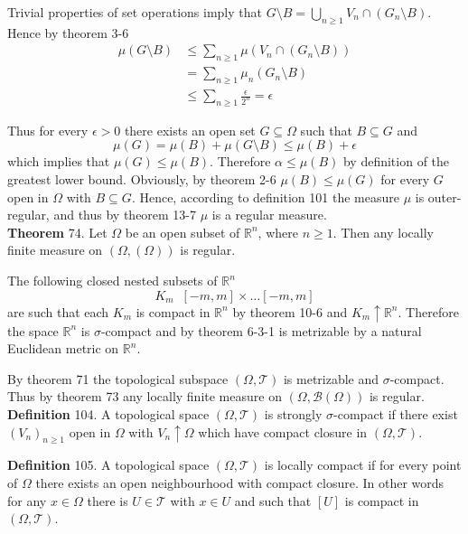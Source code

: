 \documentclass[a4paper]{article}
\newcommand{\clo}[1]{\left [ #1 \right ]}
\newcommand{\brac}[1]{\left ( #1 \right )}
\newcommand{\Real}{\mathbb{R}}
\newcommand{\Tcal}{\mathcal{T}}
\newcommand{\borel}[1]{\mathcal{B}\brac{#1}}
\newcommand{\defn}{\mathop{\overset{\Delta}{=}}\nolimits}
\begin{document}
Trivial properties of set operations imply that $G\setminus B=\bigcup_{n\geq 1} V_n \cap \brac{G_n\setminus B}$. Hence by theorem 3-6\begin{align*}\mu\brac{G\setminus B}&\leq \sum_{n\geq1}\mu\brac{V_n \cap \brac{G_n\setminus B}} \\&= \sum_{n\geq1}\mu_n\brac{G_n\setminus B}\\&\leq \sum_{n\geq1} \frac{\epsilon}{2^n} = \epsilon\end{align*}

Thus for every $\epsilon>0$ there exists an open set $G\subseteq \Omega$ such that $B\subseteq G$ and \[\mu\brac{G}=\mu\brac{B}+\mu\brac{G\setminus B}\leq \mu\brac{B}+\epsilon\] which implies that $\mu\brac{G}\leq \mu\brac{B}$. Therefore $\alpha \leq \mu\brac{B}$ by definition of the greatest lower bound. Obviously, by theorem 2-6 $\mu\brac{B}\leq \mu\brac{G}$ for every $G$ open in $\Omega$ with $B\subseteq G$. Hence, according to definition 101 the measure $\mu$ is outer-regular, and thus by theorem 13-7 $\mu$ is a regular measure.\\

\label{thm:rn_loc_fin_regular_meas} \noindent \textbf{Theorem} 74.
Let $\Omega$ be an open subset of $\Real^n$, where $n\geq1$. Then any locally finite measure on $\brac{\Omega,\brac{\Omega}}$ is regular.

The following closed nested subsets of $\Real^n$ \[K_m\defn \clo{-m,m}\times \ldots \clo{-m,m}\] are such that each $K_m$ is compact in $\Real^n$ by theorem 10-6 and $K_m\uparrow \Real^n$. Therefore the space $\Real^n$ is $\sigma$-compact and by theorem 6-3-1 is metrizable by a natural Euclidean metric on $\Real^n$.

By theorem 71 the topological subspace $\brac{\Omega, \Tcal}$ is metrizable and $\sigma$-compact. Thus by theorem 73 any locally finite measure on $\brac{\Omega, \borel{\Omega}}$ is regular.\\

\noindent\textbf{Definition} 104.
A topological space $\brac{\Omega, \Tcal}$ is strongly $\sigma$-compact if there exist $\brac{V_n}_{n\geq1}$ open in $\Omega$ with $V_n\uparrow \Omega$ which have compact closure in $\brac{\Omega, \Tcal}$.

\noindent\textbf{Definition} 105.
A topological space $\brac{\Omega, \Tcal}$ is locally compact if for every point of $\Omega$ there exists an open neighbourhood with compact closure. In other words for any $x\in \Omega$ there is $U\in \Tcal$ with $x\in U$ and such that $\clo{U}$ is compact in $\brac{\Omega, \Tcal}$.
\end{document}
